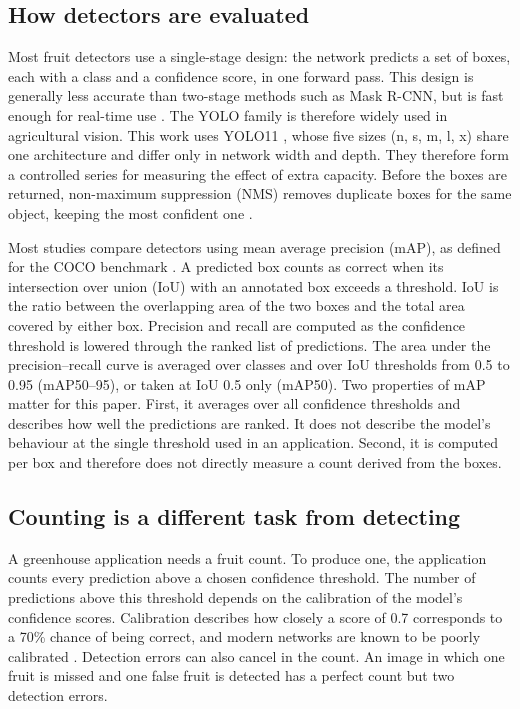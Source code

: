 \subsection{How detectors are evaluated}
\label{sec:metrics-bg}

Most fruit detectors use a single-stage design: the network predicts a set of
boxes, each with a class and a confidence score, in one forward pass. This
design is generally less accurate than two-stage methods such as Mask R-CNN,
but is fast enough for real-time use \cite{redmon2016yolo}. The YOLO family is
therefore widely used in agricultural vision. This work uses YOLO11
\cite{khanam2024yolov11, jocher2024ultralytics}, whose five sizes (n, s, m, l,
x) share one architecture and differ only in network width and depth. They
therefore form a controlled series for measuring the effect of extra capacity.
Before the boxes are returned, non-maximum suppression (NMS) removes duplicate
boxes for the same object, keeping the most confident one \cite{neubeck2006nms}.

Most studies compare detectors using mean average precision (mAP), as defined
for the COCO benchmark \cite{lin2014coco}. A predicted box counts as
correct when its intersection over union (IoU) with an annotated box exceeds a
threshold. IoU is the ratio between the overlapping area of the two boxes and
the total area covered by either box. Precision and recall are computed as the
confidence threshold is lowered through the ranked list of predictions. The
area under the precision--recall curve is averaged over classes and over IoU thresholds from
0.5 to 0.95 (mAP50--95), or taken at IoU 0.5 only (mAP50). Two properties of
mAP matter for this paper. First, it averages over all confidence thresholds and
describes how well the predictions are ranked. It does not describe the model's
behaviour at the single threshold used in an application. Second, it is computed
per box and therefore does not directly measure a count derived from the boxes.

\subsection{Counting is a different task from detecting}

A greenhouse application needs a fruit count. To produce one, the application
counts every prediction above a chosen confidence threshold. The number of
predictions above this threshold depends on the calibration of the model's
confidence scores. Calibration describes how closely a score of 0.7
corresponds to a 70\% chance of being correct, and modern networks are known to be poorly
calibrated \cite{guo2017calibration}. Detection errors can also cancel in the
count. An image in which one fruit is missed and one false fruit is detected has
a perfect count but two detection errors.

